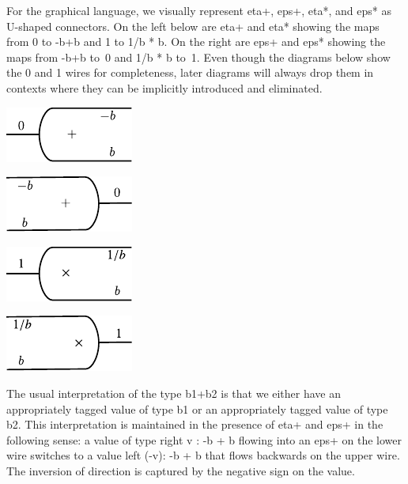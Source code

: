 \documentclass[preprint]{sigplanconf}
\begin{document}
For the graphical language, we visually represent {{eta+}}, {{eps+}},
{{eta*}}, and {{eps*}} as U-shaped connectors. On the left below are {{eta+}}
and {{eta*}} showing the maps from {{0}} to {{-b+b}} and {{1}} to {{1/b * b}}. 
On the right are {{eps+}} and {{eps*}} showing the maps from {{-b+b}} to~0 and 
{{1/b * b}} to~1. Even though the diagrams below show the {{0}} and {{1}} 
wires for completeness, later diagrams will always drop them in contexts 
where they can be implicitly introduced and eliminated. 
\begin{multicols}{2}
\begin{center}
  \includegraphics{diagrams/eta.pdf}
\end{center}
  
\begin{center}
 \includegraphics{diagrams/eps.pdf}
\end{center}
\end{multicols}
\begin{multicols}{2}
\begin{center}
  \includegraphics{diagrams/eta_times.pdf}
\end{center}
  
\begin{center}
  \includegraphics{diagrams/eps_times.pdf}
\end{center}
\end{multicols}

The usual interpretation of the type {{b1+b2}} is that we either have an
appropriately tagged value of type {{b1}} or an appropriately tagged value of
type {{b2}}. This interpretation is maintained in the presence of {{eta+}}
and {{eps+}} in the following sense: a value of type {{right v : -b + b}}
flowing into an {{eps+}} on the lower wire switches to a value 
{{left (-v): -b + b}} that flows backwards on the upper wire. The inversion of
direction is captured by the negative sign on the value. 
\end{document}
